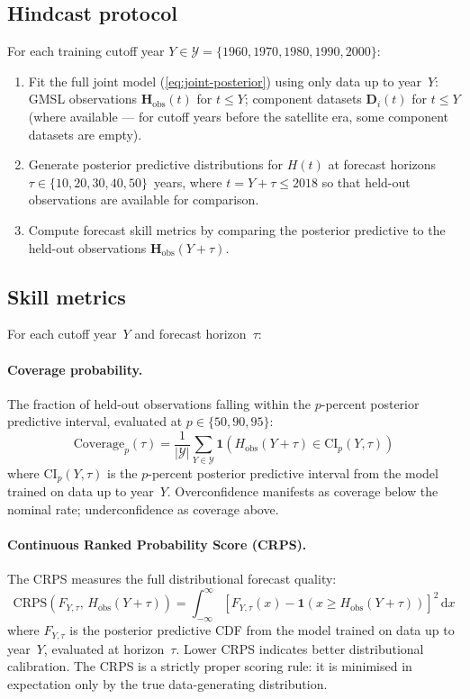 \documentclass[11pt]{article}
\begin{document}
\subsection{Hindcast protocol}

For each training cutoff year $Y \in \mathcal{Y} = \{1960, 1970, 1980, 1990, 2000\}$:
\begin{enumerate}
  \item Fit the full joint model (\cref{eq:joint-posterior}) using only data up to year~$Y$: GMSL observations $\mathbf{H}_{\text{obs}}(t)$ for $t \leq Y$; component datasets $\mathbf{D}_i(t)$ for $t \leq Y$ (where available --- for cutoff years before the satellite era, some component datasets are empty).
  \item Generate posterior predictive distributions for $H(t)$ at forecast horizons $\tau \in \{10, 20, 30, 40, 50\}$~years, where $t = Y + \tau \leq 2018$ so that held-out observations are available for comparison.
  \item Compute forecast skill metrics by comparing the posterior predictive to the held-out observations $\mathbf{H}_{\text{obs}}(Y + \tau)$.
\end{enumerate}

\subsection{Skill metrics}

For each cutoff year~$Y$ and forecast horizon~$\tau$:

\paragraph{Coverage probability.}  The fraction of held-out observations falling within the $p$-percent posterior predictive interval, evaluated at $p \in \{50, 90, 95\}$:
\begin{equation}
  \text{Coverage}_p(\tau) = \frac{1}{|\mathcal{Y}|} \sum_{Y \in \mathcal{Y}} \mathbf{1}\!\left(H_{\text{obs}}(Y+\tau) \in \text{CI}_p(Y, \tau)\right)
  \label{eq:coverage}
\end{equation}
where $\text{CI}_p(Y, \tau)$ is the $p$-percent posterior predictive interval from the model trained on data up to year~$Y$.  Overconfidence manifests as coverage below the nominal rate; underconfidence as coverage above.

\paragraph{Continuous Ranked Probability Score (CRPS).}  The CRPS measures the full distributional forecast quality:
\begin{equation}
  \text{CRPS}(F_{Y,\tau},\, H_{\text{obs}}(Y + \tau)) = \int_{-\infty}^{\infty} \left[F_{Y,\tau}(x) - \mathbf{1}(x \geq H_{\text{obs}}(Y + \tau))\right]^2 \, \mathrm{d}x
  \label{eq:crps}
\end{equation}
where $F_{Y,\tau}$ is the posterior predictive CDF from the model trained on data up to year~$Y$, evaluated at horizon~$\tau$.  Lower CRPS indicates better distributional calibration.  The CRPS is a strictly proper scoring rule: it is minimised in expectation only by the true data-generating distribution.
\end{document}
